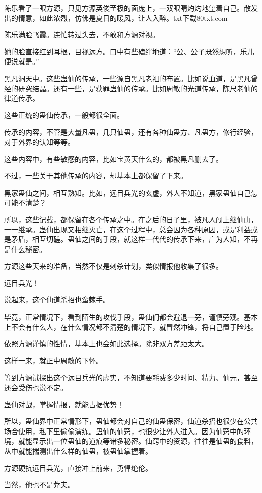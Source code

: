 \begin{this_body}
陈乐看了一眼方源，只见方源英俊至极的面庞上，一双眼睛灼灼地望着自己。散发出的情意，如此浓烈，仿佛是夏日的暖风，让人入醉。txt下载80txt.com

陈乐满脸飞霞。连忙转过头去，不敢和方源对视。

她的脸直接红到耳根，目视远方。口中有些磕绊地道：“公、公子既然想听，乐儿便说就是。”

黑凡洞天中。这些蛊仙的传承，一些源自黑凡老祖的布置。比如说血道，是黑凡曾经的研究结晶。还有一些，是获罪蛊仙的传承。比如周敏的光道传承，陈尺老仙的律道传承。

这些正统的蛊仙传承，一般都很全面。

传承的内容，不管是大量凡蛊，几只仙蛊，还有各种仙蛊方、凡蛊方，修行经验，对于外界的认知等等。

这些内容中，有些敏感的内容，比如宝黄天什么的，都被黑凡删去了。

不过，一些关于其他传承的内容，却基本上都保留了下来。

黑家蛊仙之间，相互熟知。比如，远目兵光的玄虚，外人不知道，黑家蛊仙自己怎可能不清楚？

所以，这些记载，都保留在各个传承之中。在之后的日子里，被凡人闯上继仙山，一一继承。蛊仙出现又相继灭亡，在这个过程中，总会因为各种原因，或是利益或是矛盾，相互切磋。蛊仙之间的手段，就这样一代代的传承下来，广为人知，不再是什么秘密。

方源这些天来的准备，当然不仅是刺杀计划，类似情报他收集了很多。

远目兵光！

说起来，这个仙道杀招也蛮棘手。

毕竟，正常情况下，看到陌生的攻伐手段，蛊仙们都会避退一旁，谨慎旁观。基本上不会有什么人，在什么情况都不清楚的情况下，就冒然冲锋，将自己置于险地。

依照方源谨慎的性情，基本上也会如此选择。除非双方差距太大。

这样一来，就正中周敏的下怀。

等到方源试探出这个远目兵光的虚实，不知道要耗费多少时间、精力、仙元，甚至还会受伤也说不定。

蛊仙对战，掌握情报，就能占据优势！

所以，蛊仙界中正常情形下，蛊仙都会对自己的仙蛊保密，仙道杀招也很少在公共场合使用，私下里偷偷演练。蛊仙的仙窍，也很少让外人进入。因为仙窍中的环境，就能显示出一位蛊仙的道痕等诸多秘密。仙窍中的资源，往往是仙蛊的食料，从中就能揣测出什么样的仙蛊，被蛊仙掌握着。

方源硬抗远目兵光，直接冲上前来，勇悍绝伦。

当然，他也不是莽夫。


\end{this_body}
